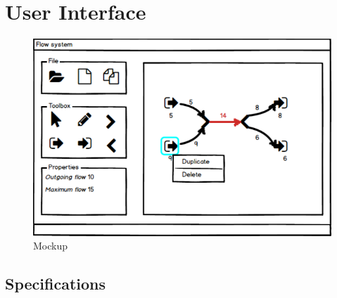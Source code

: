 \chapter{User Interface}
\begin{figure}[h!]
	\centering
	\includegraphics{figures/mockup.pdf}
	\caption{Mockup}
	\label{fig:mockup}
\end{figure}

\section{Specifications}

